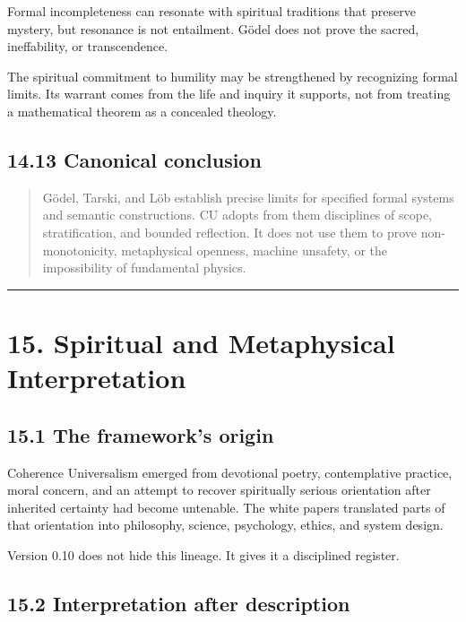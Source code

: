 \documentclass[
  11pt,
]{article}
\begin{document}
Formal incompleteness can resonate with spiritual traditions that
preserve mystery, but resonance is not entailment. Gödel does not prove
the sacred, ineffability, or transcendence.

The spiritual commitment to humility may be strengthened by recognizing
formal limits. Its warrant comes from the life and inquiry it supports,
not from treating a mathematical theorem as a concealed theology.

\subsection{14.13 Canonical conclusion}\label{canonical-conclusion-1}

\begin{quote}
Gödel, Tarski, and Löb establish precise limits for specified formal
systems and semantic constructions. CU adopts from them disciplines of
scope, stratification, and bounded reflection. It does not use them to
prove non-monotonicity, metaphysical openness, machine unsafety, or the
impossibility of fundamental physics.
\end{quote}

\begin{center}\rule{0.5\linewidth}{0.5pt}\end{center}

\section{15. Spiritual and Metaphysical
Interpretation}\label{spiritual-and-metaphysical-interpretation}

\subsection{15.1 The framework's origin}\label{the-frameworks-origin}

Coherence Universalism emerged from devotional poetry, contemplative
practice, moral concern, and an attempt to recover spiritually serious
orientation after inherited certainty had become untenable. The white
papers translated parts of that orientation into philosophy, science,
psychology, ethics, and system design.

Version 0.10 does not hide this lineage. It gives it a disciplined
register.

\subsection{15.2 Interpretation after
description}\label{interpretation-after-description}
\end{document}
